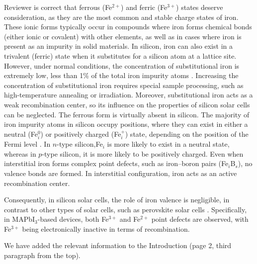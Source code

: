 \documentclass[a4paper,fleqn]{cas-sc}
\begin{document}
Reviewer is correct that ferrous (Fe$^{2+}$) and ferric (Fe$^{3+}$) states deserve consideration,
as they are the most common and stable charge states of iron.
These ionic forms typically occur in compounds where iron forms chemical bonds (either ionic or covalent) with other elements,
as well as in cases where iron is present as an impurity in solid materials.
In silicon, iron can also exist in a trivalent (ferric) state when it substitutes for a silicon atom at a lattice site.
However, under normal conditions, the concentration of substitutional iron is extremely low, less than 1\% of the total iron impurity atoms \cite{Wright2016}.
Increasing the concentration of substitutional iron requires special sample processing, such as high-temperature annealing or irradiation.
Moreover, substitutional iron acts as a weak recombination center,
so its influence on the properties of silicon solar cells can be neglected.
The ferrous form is virtually absent in silicon.
The majority of iron impurity atoms in silicon occupy positions,
where they can exist in either a neutral (Fe$_i^0$) or positively charged (Fe$_i^+$) state,
depending on the position of the Fermi level \cite{Istratov1999}.
In $n$-type silicon,Fe$_i$ is more likely to exist in a neutral state,
whereas in $p$-type silicon, it is more likely to be positively charged.
Even when interstitial iron forms complex point defects, such as iron–boron pairs (Fe$_i$B$_s$), no valence bonds are formed.
In interstitial configuration, iron acts as an active recombination center.

Consequently, in silicon solar cells, the role of iron valence is negligible,
in contrast to other types of solar cells, such as perovskite solar cells \cite{Poindexter2017}.
Specifically, in MAPbI$_3$-based devices, both Fe$^{3+}$ and Fe$^{2+}$  point defects are observed,
with Fe$^{3+}$ being electronically inactive in terms of recombination.

We have added the relevant information to the Introduction (page 2, third paragraph from the top).
\end{document}
